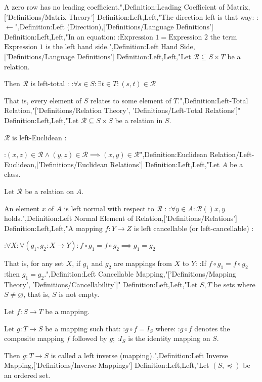 A zero row has no leading coefficient.",Definition:Leading Coefficient of Matrix,['Definitions/Matrix Theory']
Definition:Left,Left,"The direction left is that way:
:$\gets$",Definition:Left (Direction),['Definitions/Language Definitions']
Definition:Left,Left,"In an equation:
:$\text {Expression $1$} = \text {Expression $2$}$
the term $\text {Expression $1$}$ is the left hand side.",Definition:Left Hand Side,['Definitions/Language Definitions']
Definition:Left,Left,"Let $\mathcal R \subseteq S \times T$ be a relation.


Then $\mathcal R$ is left-total :
:$\forall s \in S: \exists t \in T: \left( s, t \right) \in \mathcal R$


That is,  every element of $S$ relates to some element of $T$.",Definition:Left-Total Relation,"['Definitions/Relation Theory', 'Definitions/Left-Total Relations']"
Definition:Left,Left,"Let $\mathcal R \subseteq S \times S$ be a relation in $S$.


$\mathcal R$ is left-Euclidean :

:$\left( x, z \right) \in \mathcal R \land \left( y, z \right) \in \mathcal R \implies \left( x, y \right) \in \mathcal R$",Definition:Euclidean Relation/Left-Euclidean,['Definitions/Euclidean Relations']
Definition:Left,Left,"Let $A$ be a class.

Let $\mathcal R$ be a relation on $A$.


An element $x$ of $A$ is left normal with respect to $\mathcal R$ :
:$\forall y \in A: \mathcal R \left(   \right){x, y}$ holds.",Definition:Left Normal Element of Relation,['Definitions/Relations']
Definition:Left,Left,"A mapping $f: Y \to Z$ is left cancellable (or left-cancellable) :

:$\forall X: \forall \left( g_1, g_2: X \to Y \right): f \circ g_1 = f \circ g_2 \implies g_1 = g_2$

That is, for any set $X$, if $g_1$ and $g_2$ are mappings from $X$ to $Y$:
:If $f \circ g_1 = f \circ g_2$
:then $g_1 = g_2$.",Definition:Left Cancellable Mapping,"['Definitions/Mapping Theory', 'Definitions/Cancellability']"
Definition:Left,Left,"Let $S, T$ be sets where $S \ne \varnothing$, that is, $S$ is not empty.

Let $f: S \to T$ be a mapping.


Let $g: T \to S$ be a mapping such that:
:$g \circ f = I_S$
where:
:$g \circ f$ denotes the composite mapping $f$ followed by $g$;
:$I_S$ is the identity mapping on $S$.


Then $g: T \to S$ is called a left inverse (mapping).",Definition:Left Inverse Mapping,['Definitions/Inverse Mappings']
Definition:Left,Left,"Let $\left( S, \preccurlyeq \right)$ be an ordered set.

